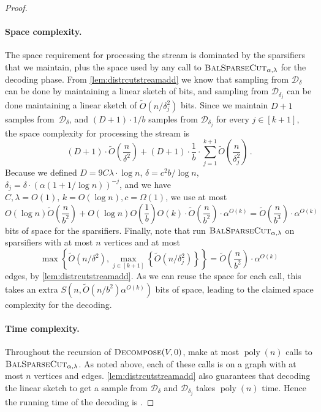 \documentclass[epsfig,letter,11pt]{article}
\numberwithin{equation}{section}
\newcommand{\otil}{\tilde{O}}
\newcommand{\bsc}{\textsc{BalSparseCut}_{\alpha,\lambda}}
\newcommand{\ed}{\textsc{Decompose}}
\renewcommand{\tilde}{\widetilde}
\DeclareMathOperator*{\poly}{poly}
\begin{document}
\begin{proof}
	\paragraph{Space complexity.} The space requirement for processing the stream is dominated by the sparsifiers that we maintain, plus the space used by any call to $\bsc$ for the decoding phase. From \cref{lem:distrcutstreamadd} we know that sampling from $\mathcal{D}_{\delta}$ can be done by maintaining a linear sketch of \smash{$\otil(n/\delta^2)$} bits, and sampling from $\mathcal{D}_{\delta_j}$ can be done maintaining a linear sketch of $\otil(n/\delta_j^2)$ bits.  Since we maintain $D+1$ samples from~$\mathcal{D}_\delta$, and $(D+1) \cdot 1/b$ samples from $\mathcal{D}_{\delta_j}$ for every $j \in [k+1]$, the space complexity for processing the stream is
	\begin{equation*}
		(D+1) \cdot \otil\left(\frac{n}{\delta^2}\right) + (D+1) \cdot \frac{1}{b}\cdot \sum_{j=1}^{k+1} \otil\left(\frac{n}{\delta_j^2}\right) \, .
	\end{equation*}
	Because we defined $D=9C\lambda \cdot \log n$, $\delta=c^2b/\log n$, $\delta_j=\delta \cdot (\alpha(1+1/\log n))^{-j}$, and we have $C,\lambda = O(1),\,k = O(\log n), c = \Omega(1)$, we use at most
	\begin{equation*}
		O(\log n) \otil\left(\frac{n}{b^2}\right) + O(\log n)  O\left(\frac{1}{b}\right)O(k) \cdot \otil\left(\frac{n}{b^2}\right) \cdot \alpha^{O(k)} = \otil\left(\frac{n}{b^3}\right) \cdot \alpha^{O(k)}
	\end{equation*}
	bits of space for the sparsifiers. Finally, note that  run $\bsc$ on sparsifiers with at most $n$ vertices and at most
	\begin{equation*}
		\max\left\{\otil(n/\delta^2),\max_{j \in [k+1]}\left\{\otil(n/\delta_{j}^2)\right\}\right\} =  \otil\left(\frac{n}{b^2}\right) \cdot \alpha^{O(k)}
	\end{equation*}
	edges, by \cref{lem:distrcutstreamadd}. As we can reuse the space for each call, this takes an extra $S(n,\otil(n/b^2)\alpha^{O(k)})$ bits of space, leading to the claimed space complexity for the decoding.
	
	\paragraph{Time complexity.}
	Throughout the recursion of $\ed(V,0)$,   make at most $\poly(n)$ calls to $\bsc$. As noted above, each of these calls is on a graph with at most $n$ vertices and \smash{$\otil(n/b^2)\alpha^{O(k)}$} edges. \cref{lem:distrcutstreamadd} also guarantees that decoding the linear sketch to get a sample from $\mathcal{D}_\delta$ and $\mathcal{D}_{\delta_j}$ takes $\poly(n)$ time. Hence the running time of the decoding is \smash{$\poly(n)\cdot T(n,\otil(n/b^2)\alpha^{O(k)})$}.
	

\end{proof}
\end{document}
